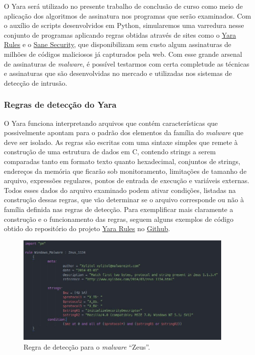 O Yara será utilizado no presente trabalho de conclusão de curso como meio de
aplicação dos algoritmos de assinatura nos programas que serão examinados. Com
o auxílio de scripts desenvolvidos em Python, simularemos uma varredura nesse
conjunto de programas aplicando regras obtidas através de sites como o
\href{yararules.org}{Yara Rules} e o
\href{http://sanesecurity.com/usage/signatures/}{Sane Security}, que
disponibilizam sem custo algum assinaturas de milhões de códigos maliciosos já
capturados pela web. Com esse grande arsenal de assinaturas de \textit{malware}, é
possível testarmos com certa completude as técnicas e assinaturas que são
desenvolvidas no mercado e utilizadas nos sistemas de detecção de intrusão.

\subsubsection{Regras de detecção do Yara}
\label{l.regrasdyara}
O Yara funciona interpretando arquivos que contém características que possivelmente
apontam para o padrão dos elementos da família do \textit{malware} que deve ser
isolado. As regras são escritas com uma sintaxe simples que remete à
construção de uma estrutura de dados em C, contendo strings a serem comparadas
tanto em formato texto quanto hexadecimal, conjuntos de strings, endereços da
memória que ficarão sob monitoramento, limitações de tamanho de arquivo,
expressões regulares, pontos de entrada de execução e variáveis externas.
Todos esses dados do arquivo examinado podem ativar condições, listadas na
construção dessas regras, que vão determinar se o arquivo corresponde ou não à
família definida nas regras de detecção. Para exemplificar mais claramente a
construção e o funcionamento das regras, seguem alguns exemplos de código
obtido do repositório do projeto \href{yararules.org}{Yara Rules} no
\href{github.com}{Github}.

\begin{figure}[h]
	\centering
	\includegraphics[width=0.95\textwidth]{figs/zeus}
	\caption{Regra de detecção para o \textit{malware} ``Zeus''.}
	\label{f.regrazeus}
\end{figure}

